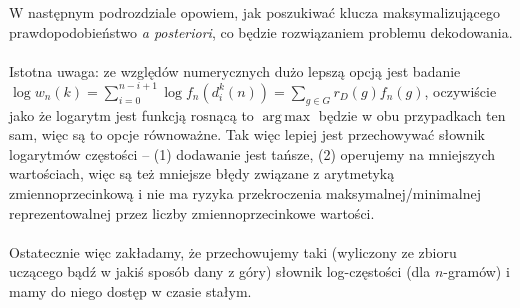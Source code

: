 \documentclass[a4paper]{article}
\DeclareMathOperator*{\argmax}{arg\,max}
\begin{document}
W następnym podrozdziale opowiem, jak poszukiwać klucza maksymalizującego prawdopodobieństwo \textit{a posteriori}, co będzie rozwiązaniem problemu dekodowania.\\\\
Istotna uwaga: ze względów numerycznych dużo lepszą opcją jest badanie $\log w_n(k) = \sum\limits_{i=0}^{n-i+1} \log f_n(d_i^k(n)) = \sum\limits_{g \in G}{r_D(g)} f_n(g)$, oczywiście jako że logarytm jest funkcją rosnącą to $\argmax$ będzie w obu przypadkach ten sam, więc są to opcje równoważne. Tak więc lepiej jest przechowywać słownik logarytmów częstości – (1) dodawanie jest tańsze, (2) operujemy na mniejszych wartościach, więc są też mniejsze błędy związane z arytmetyką zmiennoprzecinkową i nie ma ryzyka przekroczenia maksymalnej/minimalnej reprezentowalnej przez liczby zmiennoprzecinkowe wartości.\\\\
Ostatecznie więc zakładamy, że przechowujemy taki (wyliczony ze zbioru uczącego bądź w jakiś sposób dany z góry) słownik log-częstości (dla $n$-gramów) i mamy do niego dostęp w czasie stałym.
\end{document}
